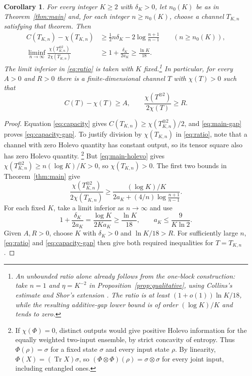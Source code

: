 \documentclass[11pt]{article}
\numberwithin{equation}{section}
\newtheorem{corollary}[theorem]{Corollary}
\theoremstyle{boldremark}\newtheorem{remark}[theorem]{Remark}
\DeclareMathOperator{\Tr}{Tr}
\begin{document}
\begin{corollary}\label{cor:capacity}
For every integer $K\ge2$ with $\delta_K>0$, let $n_0(K)$ be as in
Theorem~\ref{thm:main} and, for each integer $n\ge n_0(K)$, choose a
channel $T_{K,n}$ satisfying that theorem. Then
\begin{align}
 C(T_{K,n})-\chi(T_{K,n})
 &\ge\tfrac12n\delta_K-2\log\frac{n+1}{n-1}
 \qquad(n\ge n_0(K)),
 \label{eq:capacity-gap}\\
 \liminf_{n\to\infty}
 \frac{\chi(T_{K,n}^{\otimes2})}{2\chi(T_{K,n})}
 &\ge1+\frac{\delta_K}{2a_K}\ge\frac{\ln K}{18}.
 \label{eq:ratio}
\end{align}
The limit inferior in \eqref{eq:ratio} is taken with $K$ fixed.\footnote{An
unbounded ratio alone already follows from the one-block construction:
take $n=1$ and $\eta=K^{-2}$ in Proposition~\ref{prop:qualitative},
using Collins's estimate and Shor's extension \cite{Collins,Shor}.
The ratio is at least $(1+o(1))\ln K/18$, while the resulting additive-gap lower
bound is of order $(\log K)/K$ and tends to zero.}
In particular, for every $A>0$ and $R>0$ there is a finite-dimensional
channel $T$ with $\chi(T)>0$ such that
\[
 C(T)-\chi(T)\ge A,
 \qquad \frac{\chi(T^{\otimes2})}{2\chi(T)}\ge R.
\]
\end{corollary}
\begin{proof}
Equation \eqref{eq:capacity} gives
$C(T_{K,n})\ge\chi(T_{K,n}^{\otimes2})/2$, and \eqref{eq:main-gap} proves
\eqref{eq:capacity-gap}.
To justify division by $\chi(T_{K,n})$ in \eqref{eq:ratio}, note that
a channel with zero Holevo quantity has constant output, so its
tensor square also has zero Holevo quantity.%
\footnote{If $\chi(\Phi)=0$, distinct outputs would give positive
Holevo information for the equally weighted two-input ensemble,
by strict concavity of entropy. Thus $\Phi(\rho)=\sigma$ for a fixed
state $\sigma$ and every input state $\rho$. By linearity,
$\Phi(X)=(\Tr X)\sigma$, so
$(\Phi\otimes\Phi)(\rho)=\sigma\otimes\sigma$ for every joint input,
including entangled ones.}
But \eqref{eq:main-holevo} gives
$\chi(T_{K,n}^{\otimes2})\ge n(\log K)/K>0$, so
$\chi(T_{K,n})>0$. The first two bounds in Theorem~\ref{thm:main} give
\[
 \frac{\chi(T_{K,n}^{\otimes2})}{2\chi(T_{K,n})}
 \ge\frac{(\log K)/K}{2a_K+(4/n)\log\frac{n+1}{n-1}}.
\]
For each fixed $K$, take a limit inferior as $n\to\infty$ and use
\[
 1+\frac{\delta_K}{2a_K}=\frac{\log K}{2Ka_K}
 \ge\frac{\ln K}{18},
 \qquad a_K\le\frac9{K\ln2}.
\]
Given $A,R>0$, choose $K$ with $\delta_K>0$ and $\ln K/18>R$.
For sufficiently large $n$, \eqref{eq:ratio} and
\eqref{eq:capacity-gap} then give both required inequalities for
$T=T_{K,n}$.
\end{proof}
\end{document}
